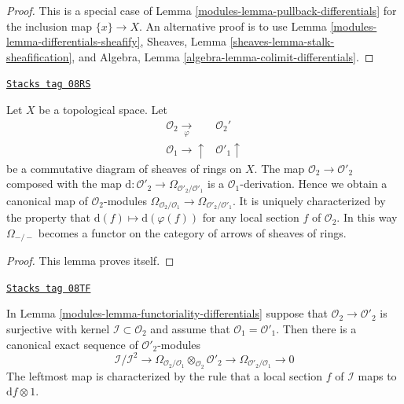 \begin{proof}

This is a special case of Lemma \ref{modules-lemma-pullback-differentials}
for the inclusion map $\{x\} \to X$. An alternative proof is to use
Lemma \ref{modules-lemma-differentials-sheafify},
Sheaves, Lemma \ref{sheaves-lemma-stalk-sheafification}, and
Algebra, Lemma \ref{algebra-lemma-colimit-differentials}.
\end{proof}

\begin{lemma}
\label{modules-lemma-functoriality-differentials}
\href{https://stacks.math.columbia.edu/tag/08RS}{\texttt{Stacks tag 08RS}}

Let $X$ be a topological space. Let
$$
\begin{array}{cc}\mathcal{O}_2 \underset{\varphi}{\longrightarrow} & \mathcal{O}_2' \\ \mathcal{O}_1 \longrightarrow\uparrow & \mathcal{O}'_1 \uparrow\end{array}
$$
be a commutative diagram of sheaves of rings on $X$. The map
$\mathcal{O}_2 \to \mathcal{O}'_2$ composed with the map
$\text{d} : \mathcal{O}'_2 \to \Omega_{\mathcal{O}'_2/\mathcal{O}'_1}$
is a $\mathcal{O}_1$-derivation. Hence we obtain a canonical map of
$\mathcal{O}_2$-modules
$\Omega_{\mathcal{O}_2/\mathcal{O}_1} \to
\Omega_{\mathcal{O}'_2/\mathcal{O}'_1}$.
It is uniquely characterized by the property that
$\text{d}(f) \mapsto \text{d}(\varphi(f))$
for any local section $f$ of $\mathcal{O}_2$.
In this way $\Omega_{-/-}$ becomes a functor on the category
of arrows of sheaves of rings.
\end{lemma}

\begin{proof}
This lemma proves itself.
\end{proof}

\begin{lemma}
\label{modules-lemma-differential-seq}
\href{https://stacks.math.columbia.edu/tag/08TF}{\texttt{Stacks tag 08TF}}

In Lemma \ref{modules-lemma-functoriality-differentials} suppose that
$\mathcal{O}_2 \to \mathcal{O}'_2$ is surjective with kernel
$\mathcal{I} \subset \mathcal{O}_2$ and assume that
$\mathcal{O}_1 = \mathcal{O}'_1$. Then there is a canonical exact
sequence of $\mathcal{O}'_2$-modules
$$
\mathcal{I}/\mathcal{I}^2
\longrightarrow
\Omega_{\mathcal{O}_2/\mathcal{O}_1} \otimes_{\mathcal{O}_2} \mathcal{O}'_2
\longrightarrow
\Omega_{\mathcal{O}'_2/\mathcal{O}_1}
\longrightarrow
0
$$
The leftmost map is characterized by the rule that a local section
$f$ of $\mathcal{I}$ maps to $\text{d}f \otimes 1$.
\end{lemma}

